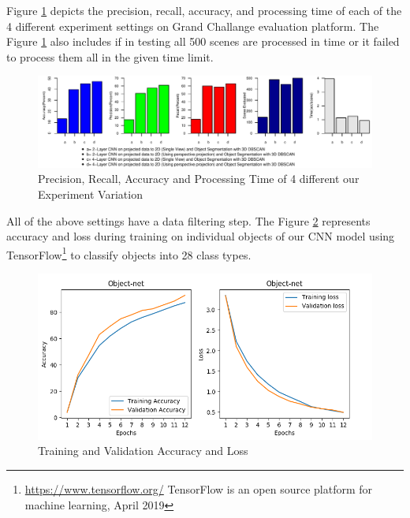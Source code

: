 Figure \ref{fig:evaluation2} depicts the precision, recall, accuracy, and processing time of each of the 4 different experiment settings on Grand Challange evaluation platform.
The Figure \ref{fig:evaluation2} also includes if in testing all 500 scenes are processed in time
or it failed to process them all in the given time limit.
\begin{figure}[htp]
\begin{center}
  \includegraphics[width=1\linewidth]{images/evaluation2.pdf}
  \caption{Precision, Recall, Accuracy and Processing Time of 4 different our Experiment Variation}
  \label{fig:evaluation2}
\end{center}
\end{figure}
All of the above settings have a data filtering step. The Figure \ref{fig:accloss} represents accuracy and loss during training on individual objects of our CNN model
using TensorFlow\footnote{\url{https://www.tensorflow.org/} TensorFlow is an open source platform
for machine learning, April 2019} to classify objects into 28 class types.


\begin{figure}[htp]
\begin{center}
        \includegraphics[scale=0.42]{images/accuracy-loss.png}
        \caption{Training and Validation Accuracy and Loss}
        \label{fig:accloss}
\end{center}
\end{figure}







